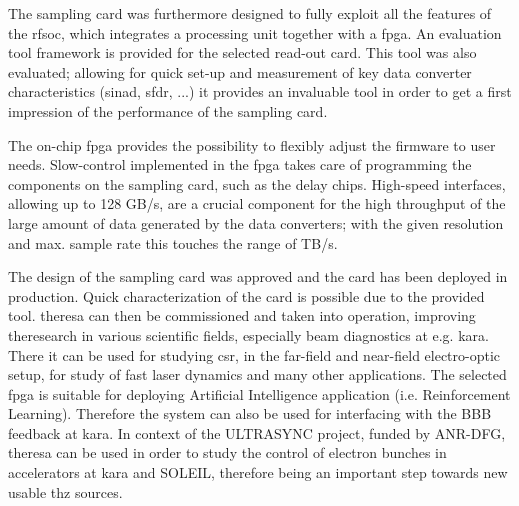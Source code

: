 The sampling card was furthermore designed to fully exploit all the features of the \gls{rfsoc}, which integrates a processing unit together with a \gls{fpga}.
An evaluation tool framework is provided for the selected read-out card.
This tool was also evaluated; allowing for quick set-up and measurement of key data converter characteristics (\gls{sinad}, \gls{sfdr}, ...) it provides an invaluable tool in order to get a first impression of the performance of the sampling card.

The on-chip \gls{fpga} provides the possibility to flexibly adjust the firmware to user needs. 
Slow-control implemented in the \gls{fpga} takes care of programming the components on the sampling card, such as the delay chips.
High-speed interfaces, allowing up to 128 GB/s, are a crucial component for the high throughput of the large amount of data generated by the data converters; with the given resolution and max. sample rate this touches the range of TB/s.


The design of the sampling card was approved and the card has been deployed in production.
Quick characterization of the card is possible due to the provided tool.
\gls{theresa} can then be commissioned and taken into operation, improving theresearch in various scientific fields, especially beam diagnostics at e.g. \gls{kara}. 
There it can be used for studying \gls{csr}, in the far-field and near-field electro-optic setup, for study of fast laser dynamics and many other applications.
The selected \gls{fpga} is suitable for deploying Artificial Intelligence application (i.e. Reinforcement Learning).
Therefore the system can also be used for interfacing with the BBB feedback at \gls{kara}.
In context of the ULTRASYNC project, funded by ANR-DFG, \gls{theresa} can be used in order to study the control of electron bunches in accelerators at \gls{kara} and SOLEIL, therefore being an important step towards new usable \gls{thz} sources. 
 

